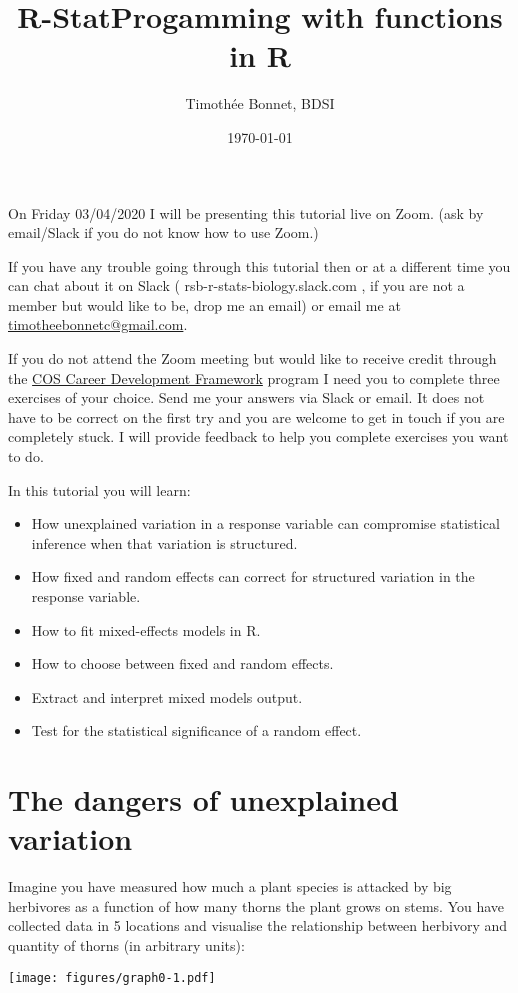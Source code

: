 \documentclass[12pt,a4paper]{scrartcl}\usepackage[]{graphicx}\usepackage[]{color}
\title{R-StatProgamming with functions in R}
\date{\today}
\author{Timoth\'ee Bonnet, BDSI}
\begin{document}
\maketitle

On Friday 03/04/2020 I will be presenting this tutorial live on Zoom. (ask by email/Slack if you do not know how to use Zoom.)

If you have any trouble going through this tutorial then or at a different time you can chat about it on Slack ( rsb-r-stats-biology.slack.com , if you are not a member but would like to be, drop me an email) or email me at \href{mailto:timotheebonnetc@gmail.com}{timotheebonnetc@gmail.com}.

If you do not attend the Zoom meeting but would like to receive credit through the \href{https://wattlecourses.anu.edu.au/enrol/index.php?id=23938}{COS Career Development Framework} program I need you to complete three exercises of your choice. Send me your answers via Slack or email. It does not have to be correct on the first try and you are welcome to get in touch if you are completely stuck. I will provide feedback to help you complete exercises you want to do.

In this tutorial you will learn:

\begin{itemize}
    \item How unexplained variation in a response variable can compromise statistical inference when that variation is structured.
    \item How fixed and random effects can correct for structured variation in the response variable.
    \item How to fit mixed-effects models in R.
    \item How to choose between fixed and random effects.
    \item Extract and interpret mixed models output.
    \item Test for the statistical significance of a random effect.
\end{itemize}

\tableofcontents
\ListOfExerciseInToc
{}

\clearpage

\section{The dangers of unexplained variation}
Imagine you have measured how much a plant species is attacked by big herbivores as a function of how many thorns the plant grows on stems. You have collected data in 5 locations and visualise the relationship between herbivory and quantity of thorns (in arbitrary units):
\begin{center}
  \texttt{[image: figures/graph0-1.pdf]}
\end{center}
\end{document}
